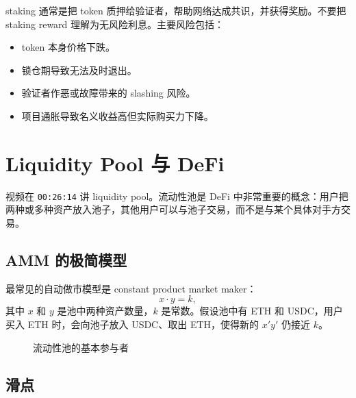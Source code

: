 \documentclass[UTF8,11pt]{ctexart}
\newcommand{\timestamp}[1]{\textcolor{blue!50!black}{\texttt{#1}}}
\begin{document}
staking 通常是把 token 质押给验证者，帮助网络达成共识，并获得奖励。不要把 staking reward 理解为无风险利息。主要风险包括：
\begin{itemize}
  \item token 本身价格下跌。
  \item 锁仓期导致无法及时退出。
  \item 验证者作恶或故障带来的 slashing 风险。
  \item 项目通胀导致名义收益高但实际购买力下降。
\end{itemize}

\section{Liquidity Pool 与 DeFi}
\label{sec:defi}

视频在 \timestamp{00:26:14} 讲 liquidity pool。流动性池是 DeFi 中非常重要的概念：用户把两种或多种资产放入池子，其他用户可以与池子交易，而不是与某个具体对手方交易。

\subsection{AMM 的极简模型}

最常见的自动做市模型是 constant product market maker：
\[
x \cdot y = k,
\]
其中 \(x\) 和 \(y\) 是池中两种资产数量，\(k\) 是常数。假设池中有 ETH 和 USDC，用户买入 ETH 时，会向池子放入 USDC、取出 ETH，使得新的 \(x'y'\) 仍接近 \(k\)。

\begin{figure}[h]
\centering
{}
\caption{流动性池的基本参与者}
\end{figure}

\subsection{滑点}
\end{document}
